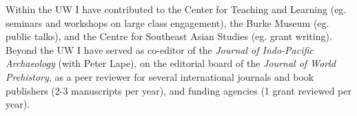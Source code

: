 \documentclass[11pt,article,oneside]{memoir}
\begin{document}
Within the UW I have contributed to the Center for Teaching and Learning (eg. seminars and workshops on large class engagement), the Burke Museum (eg. public talks), and the Centre for Southeast Asian Studies (eg. grant writing). Beyond the UW I have served as co-editor of the \textit{Journal of Indo-Pacific Archaeology} (with Peter Lape), on the editorial board of the \textit{Journal of World Prehistory}, as a peer reviewer for several international journals and book publishers (2-3 manuscripts per year), and funding agencies (1 grant reviewed per year). 
\end{document}
